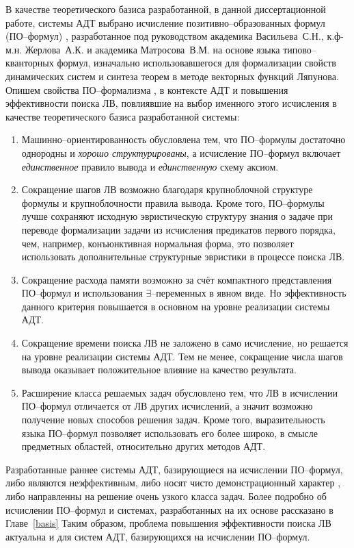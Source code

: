 \documentclass[a4paper]{report}
\begin{document}
В качестве теоретического базиса разработанной, в данной диссертационной работе, системы АДТ выбрано исчисление позитивно--образованных формул (ПО--формул) \cite{ICDS2000, Vas1995}, разработанное под руководством академика Васильева~С.Н., к.ф-м.н. Жерлова~А.К. и академика Матросова~В.М. на основе языка типово--кванторных формул, изначально использовавшегося для формализации свойств динамических систем и синтеза теорем в методе векторных функций Ляпунова. Опишем свойства ПО--формализма \cite{ICDS2000}, в контексте АДТ и повышения эффективности поиска ЛВ, повлиявшие на выбор именного этого исчисления в качестве теоретического базиса разработанной системы:
\begin{enumerate}
\item {Машинно--ориентированность} обусловлена тем, что ПО--формулы достаточно однородны и \emph{хорошо структурированы}, а исчисление ПО--формул включает \emph{единственное} правило вывода и \emph{единственную} схему аксиом.
\item {Сокращение шагов ЛВ} возможно благодаря крупноблочной структуре формулы и крупноблочности правила вывода. Кроме того, ПО--формулы лучше сохраняют исходную эвристическую структуру знания о задаче при переводе формализации задачи из исчисления предикатов первого порядка, чем, например, конъюнктивная нормальная форма, это позволяет использовать дополнительные структурные эвристики в процессе поиска ЛВ. 
\item {Сокращение расхода памяти} возможно за счёт компактного представления ПО--формул и использования $\exists$--переменных в явном виде. Но эффективность данного критерия повышается в основном на уровне реализации системы АДТ.
\item {Сокращение времени поиска ЛВ} не заложено в само исчисление, но решается на уровне реализации системы АДТ. Тем не менее, сокращение числа шагов вывода оказывает положительное влияние на качество результата.
\item {Расширение класса решаемых задач} обусловлено тем, что ЛВ в исчислении ПО--формул отличается от ЛВ других исчислений, а значит возможно получение новых способов решения задач. Кроме того, выразительность языка ПО--формул позволяет использовать его более широко, в смысле предметных областей, относительно других методов АДТ. 
\end{enumerate}

Разработанные раннее системы АДТ, базирующиеся на исчислении ПО--формул, либо являются неэффективным, либо носят чисто демонстрационный характер \cite{dissChe}, либо направленны на решение очень узкого класса задач. Более подробно об исчислении ПО--формул и системах, разработанных на их основе рассказано в Главе~\ref{basis} Таким образом, проблема повышения эффективности поиска ЛВ актуальна и для систем АДТ, базирующихся на исчислении ПО--формул.
\end{document}
